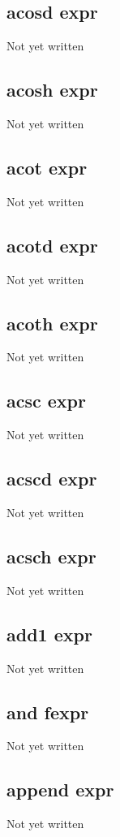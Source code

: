 \documentclass[a4paper,11pt]{article}
\begin{document}
\subsection{\ttfamily acosd expr}
Not yet written

\subsection{\ttfamily acosh expr}
Not yet written

\subsection{\ttfamily acot expr}
Not yet written

\subsection{\ttfamily acotd expr}
Not yet written

\subsection{\ttfamily acoth expr}
Not yet written

\subsection{\ttfamily acsc expr}
Not yet written

\subsection{\ttfamily acscd expr}
Not yet written

\subsection{\ttfamily acsch expr}
Not yet written

\subsection{\ttfamily add1 expr}
Not yet written

\subsection{\ttfamily and fexpr}
Not yet written

\subsection{\ttfamily append expr}
Not yet written
\end{document}
